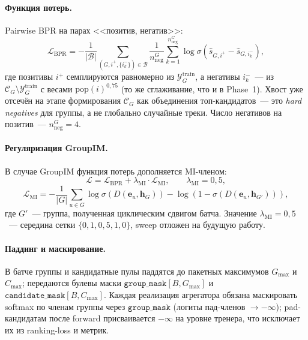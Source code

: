 \paragraph{Функция потерь.} Pairwise BPR на парах <<позитив, негатив>>:
\begin{equation*}
    \mathcal{L}_{\mathrm{BPR}} = -\frac{1}{|\mathcal{B}|} \sum_{(G, i^+, \{i^-_k\}) \in \mathcal{B}} \frac{1}{n_{\mathrm{neg}}^G} \sum_{k=1}^{n_{\mathrm{neg}}^G} \log \sigma\!\left( \hat{s}_{G, i^+} - \hat{s}_{G, i^-_k} \right),
\end{equation*}
где позитивы $i^+$ семплируются равномерно из $\mathcal{Y}_G^{\mathrm{train}}$, а негативы $i^-_k$~--- из $\mathcal{C}_G \setminus \mathcal{Y}_G^{\mathrm{train}}$ с весами $\mathrm{pop}(i)^{0{,}75}$ (то же сглаживание, что и в Phase~1). Хвост уже отсечён на этапе формирования $\mathcal{C}_G$ как объединения топ-кандидатов~--- это \emph{hard negatives} для группы, а не глобально случайные треки. Число негативов на позитив~--- $n_{\mathrm{neg}}^G = 4$.

\paragraph{Регуляризация GroupIM.} В случае GroupIM функция потерь дополняется MI-членом:
\begin{equation*}
    \mathcal{L} = \mathcal{L}_{\mathrm{BPR}} + \lambda_{\mathrm{MI}} \cdot \mathcal{L}_{\mathrm{MI}}, \qquad \lambda_{\mathrm{MI}} = 0{,}5,
\end{equation*}
\begin{equation*}
    \mathcal{L}_{\mathrm{MI}} = -\frac{1}{|G|}\sum_{u \in G} \log \sigma\!\left( D(\mathbf{e}_u, \mathbf{h}_G) \right) - \log\!\left( 1 - \sigma\!\left( D(\mathbf{e}_u, \mathbf{h}_{G'}) \right) \right),
\end{equation*}
где $G'$~--- группа, полученная циклическим сдвигом батча. Значение $\lambda_{\mathrm{MI}} = 0{,}5$~--- середина сетки $\{0{,}1, 0{,}5, 1{,}0\}$, sweep отложен на будущую работу.

\paragraph{Паддинг и маскирование.} В батче группы и кандидатные пулы паддятся до пакетных максимумов $G_{\max}$ и $C_{\max}$; передаются булевы маски $\mathtt{group\_mask}[B, G_{\max}]$ и $\mathtt{candidate\_mask}[B, C_{\max}]$. Каждая реализация агрегатора обязана маскировать softmax по членам группы через $\mathtt{group\_mask}$ (логиты пад-членов $\to -\infty$); pad-кандидатам после forward присваивается $-\infty$ на уровне тренера, что исключает их из ranking-loss и метрик.

